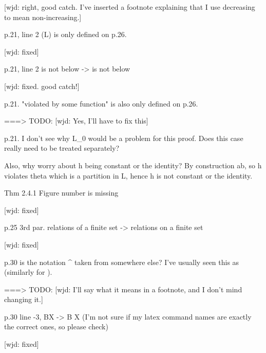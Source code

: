 [wjd: right, good catch.  I've inserted a footnote explaining that I use decreasing to mean non-increasing.]

p.21, line 2 \lambda(L) is only defined on p.26.

[wjd: fixed]

p.21, line 2 \theta is not below \alpha -> \alpha is not below \theta

[wjd: fixed. good catch!]

p.21. "violated by some function" is also only defined on p.26.

===> TODO:
[wjd: Yes, I'll have to fix this]

p.21. I don't see why L_0  would be a problem for this proof. Does this case really need to be treated separately? 

Also, why worry about h being constant or the identity? By construction a\ne b, so h violates theta which is a partition in L, hence h is not constant or the identity.

Thm 2.4.1 Figure number is missing

[wjd: fixed]

p.25 3rd par. relations of a finite set -> relations on a finite set

[wjd: fixed]

p.30 is the notation \alpha^{\downarrow} taken from somewhere else? I've usually seen this as {\downarrow}\alpha (similarly for \uparrow).

===> TODO:
[wjd: I'll say what it means in a footnote, and I don't mind changing it.]

p.30 line -3, B\lessnotequal X -> B \subsetne X  (I'm not sure if my latex command names are exactly the correct ones, so please check)

[wjd: fixed]
